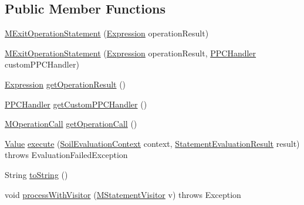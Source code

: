 \subsection*{Public Member Functions}
\begin{DoxyCompactItemize}
\item 
\hyperlink{classorg_1_1tzi_1_1use_1_1uml_1_1sys_1_1soil_1_1_m_exit_operation_statement_a9b92366baefc2038a00e140b3da6c2a5}{M\-Exit\-Operation\-Statement} (\hyperlink{classorg_1_1tzi_1_1use_1_1uml_1_1ocl_1_1expr_1_1_expression}{Expression} operation\-Result)
\item 
\hyperlink{classorg_1_1tzi_1_1use_1_1uml_1_1sys_1_1soil_1_1_m_exit_operation_statement_aa5e56c0d1a655df0dec05e4c525c596a}{M\-Exit\-Operation\-Statement} (\hyperlink{classorg_1_1tzi_1_1use_1_1uml_1_1ocl_1_1expr_1_1_expression}{Expression} operation\-Result, \hyperlink{interfaceorg_1_1tzi_1_1use_1_1uml_1_1sys_1_1ppc_handling_1_1_p_p_c_handler}{P\-P\-C\-Handler} custom\-P\-P\-C\-Handler)
\item 
\hyperlink{classorg_1_1tzi_1_1use_1_1uml_1_1ocl_1_1expr_1_1_expression}{Expression} \hyperlink{classorg_1_1tzi_1_1use_1_1uml_1_1sys_1_1soil_1_1_m_exit_operation_statement_a003e4400fd9e596208cd0d2bdaa750de}{get\-Operation\-Result} ()
\item 
\hyperlink{interfaceorg_1_1tzi_1_1use_1_1uml_1_1sys_1_1ppc_handling_1_1_p_p_c_handler}{P\-P\-C\-Handler} \hyperlink{classorg_1_1tzi_1_1use_1_1uml_1_1sys_1_1soil_1_1_m_exit_operation_statement_a6c48cd47772d574f5b0c9b6f7d3ac0ab}{get\-Custom\-P\-P\-C\-Handler} ()
\item 
\hyperlink{classorg_1_1tzi_1_1use_1_1uml_1_1sys_1_1_m_operation_call}{M\-Operation\-Call} \hyperlink{classorg_1_1tzi_1_1use_1_1uml_1_1sys_1_1soil_1_1_m_exit_operation_statement_aa529d49a9505cffd629194c056c3d676}{get\-Operation\-Call} ()
\item 
\hyperlink{classorg_1_1tzi_1_1use_1_1uml_1_1ocl_1_1value_1_1_value}{Value} \hyperlink{classorg_1_1tzi_1_1use_1_1uml_1_1sys_1_1soil_1_1_m_exit_operation_statement_a9e98186b01d88d17c4ab8eb9b29bd58e}{execute} (\hyperlink{classorg_1_1tzi_1_1use_1_1uml_1_1sys_1_1soil_1_1_soil_evaluation_context}{Soil\-Evaluation\-Context} context, \hyperlink{classorg_1_1tzi_1_1use_1_1uml_1_1sys_1_1_statement_evaluation_result}{Statement\-Evaluation\-Result} result)  throws Evaluation\-Failed\-Exception 
\item 
String \hyperlink{classorg_1_1tzi_1_1use_1_1uml_1_1sys_1_1soil_1_1_m_exit_operation_statement_a144e804395175410a31cebd6e917f7f1}{to\-String} ()
\item 
void \hyperlink{classorg_1_1tzi_1_1use_1_1uml_1_1sys_1_1soil_1_1_m_exit_operation_statement_a08435126e7a3985a3caa239f6f7cb975}{process\-With\-Visitor} (\hyperlink{interfaceorg_1_1tzi_1_1use_1_1uml_1_1sys_1_1soil_1_1_m_statement_visitor}{M\-Statement\-Visitor} v)  throws Exception 
\end{DoxyCompactItemize}
